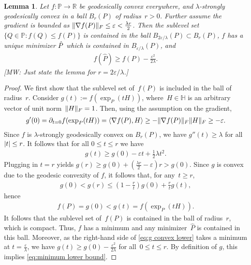 \documentclass[aos]{imsart}
\newtheorem{lemma}[theorem]{Lemma}
\theoremstyle{definition}
\numberwithin{equation}{section}
\DeclarePairedDelimiter{\abs}{\lvert}{\rvert}
\DeclarePairedDelimiter{\norm}{\lVert}{\rVert}
\newcommand{\R}{{\mathbb{R}}}
\renewcommand{\P}{{\mathbb{P}}}
\renewcommand{\H}{{\mathbb{H}}}
\newcommand{\eps}{\varepsilon}
\newcommand{\MW}[1]{{\color{red}[MW: #1]}}
\begin{document}
\begin{lemma}\label{lem:convex-ball}
Let $f\colon \P \to \R$ be geodesically convex everywhere, and $\lambda$-strongly geodesically convex in a ball $B_r(P)$ of radius~$r>0$.
Further assume the gradient is bounded as $\norm{\nabla f(P)}_F \leq \eps < \frac{\lambda r} 2$.
Then the sublevel set $\{Q \in \P : f(Q) \leq f(P)\}$ is contained in the ball $B_{2\eps/\lambda}(P) \subset B_r(P)$, $f$ has a unique minimizer $\cramped{\hat P}$ which is contained in $B_{\eps/\lambda}(P)$, and
\begin{align}\label{eq:minimum lower bound}
  f(\hat P) \geq f(P) - \frac{\eps^2}{2 \lambda}.
\end{align}
\MW{Just state the lemma for $r=2\eps/\lambda$.}
\end{lemma}
\begin{proof}
We first show that the sublevel set of~$f(P)$ is included in the ball of radius~$r$.
Consider $g(t) := f(\exp_P(tH))$, where~$H\in\H$ is an arbitrary vector of unit norm~$\norm H_F = 1$.
Then, using the assumption on the gradient,
\begin{align}\label{eq:grad bound}
  g'(0)
= \partial_{t=0} f(\exp_P(tH))
= \braket{\nabla f(P), H}
\geq -\norm{\nabla f(P)}_F \norm H_F
\geq -\eps.
\end{align}
Since $f$ is $\lambda$-strongly geodesically convex on $B_r(P)$, we have $g''(t) \geq \lambda$ for all $\abs t\leq r$.
It follows that for all $0 \leq t \leq  r$ we have
\begin{align}\label{eq:g convex lower}
  g(t) \geq g(0) - \eps t + \frac12 \lambda t^2.
\end{align}
Plugging in $t = r$ yields
$g(r) \geq  %
g(0) + \left( \frac{\lambda r}2 - \eps \right)  r
> g(0)$.
Since $g$ is convex due to the geodesic convexity of $f$, it follows that, for any~$t \geq  r$,
\begin{align*}
  g(0) < g( r) \leq \left( 1-\frac{ r}t \right) g(0) + \frac{ r}t g(t),
\end{align*}
hence
\begin{align*}
  f(P) = g(0) < g(t) = f(\exp_P(tH)).
\end{align*}
It follows that the sublevel set of~$f(P)$ is contained in the ball of radius~$r$, which is compact.
Thus, $f$ has a minimum and any minimizer~$\hat P$ is contained in this ball.
Moreover, as the right-hand side of \cref{eq:g convex lower} takes a minimum at $t=\frac\eps\lambda$, we have $g(t) \geq g(0) - \frac{\eps^2}{2\lambda}$ for all~$0\leq t\leq r$.
By definition of $g$, this implies \cref{eq:minimum lower bound}.


\end{proof}
\end{document}
